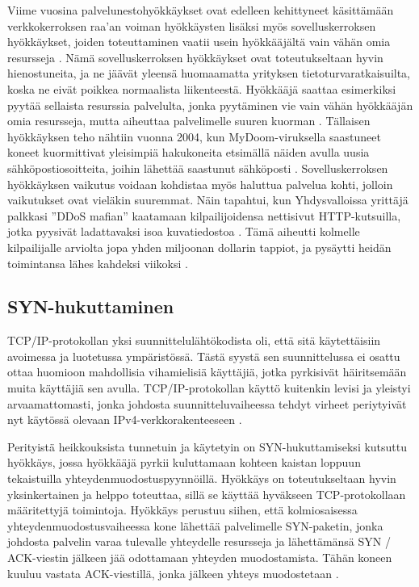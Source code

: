Viime vuosina palvelunestohyökkäykset ovat edelleen kehittyneet
käsittämään verkkokerroksen raa’an voiman hyökkäysten lisäksi myös
sovelluskerroksen hyökkäykset, joiden toteuttaminen vaatii usein
hyökkääjältä vain vähän omia resursseja \cite{Hacking}. Nämä sovelluskerroksen
hyökkäykset ovat toteutukseltaan hyvin hienostuneita, ja ne
jäävät yleensä huomaamatta yrityksen tietoturvaratkaisuilta, koska ne
eivät poikkea normaalista liikenteestä. Hyökkääjä saattaa esimerkiksi
pyytää sellaista resurssia palvelulta, jonka pyytäminen vie vain vähän
hyökkääjän omia resursseja, mutta aiheuttaa palvelimelle suuren
kuorman \cite{DDOSb}. Tällaisen hyökkäyksen teho nähtiin vuonna 2004, kun
MyDoom-viruksella saastuneet koneet kuormittivat yleisimpiä
hakukoneita etsimällä näiden avulla uusia sähköpostiosoitteita, joihin
lähettää saastunut sähköposti \cite{Hacking}. Sovelluskerroksen hyökkäyksen
vaikutus voidaan kohdistaa myös haluttua palvelua kohti, jolloin
vaikutukset ovat vieläkin suuremmat. Näin tapahtui, kun Yhdysvalloissa
yrittäjä palkkasi ”DDoS mafian” kaatamaan kilpailijoidensa nettisivut
HTTP-kutsuilla, jotka pyysivät ladattavaksi isoa kuvatiedostoa
\cite{DDOSb}. Tämä aiheutti kolmelle kilpailijalle arviolta jopa yhden
miljoonan dollarin tappiot, ja pysäytti heidän toimintansa lähes kahdeksi
viikoksi \cite{FBI}.

\subsection{SYN-hukuttaminen}
TCP/IP-protokollan yksi suunnittelulähtökodista oli, että sitä
käytettäisiin avoimessa ja luotetussa ympäristössä. Tästä syystä sen
suunnittelussa ei osattu ottaa huomioon mahdollisia vihamielisiä
käyttäjiä, jotka pyrkisivät häiritsemään muita käyttäjiä sen
avulla. TCP/IP-protokollan käyttö kuitenkin levisi ja yleistyi
arvaamattomasti, jonka johdosta suunnitteluvaiheessa tehdyt virheet
periytyivät nyt käytössä olevaan IPv4-verkkorakenteeseen \cite{Hacking}.

Perityistä heikkouksista tunnetuin ja käytetyin on SYN-hukuttamiseksi kutsuttu
hyökkäys, jossa hyökkääjä pyrkii kuluttamaan kohteen kaistan loppuun
tekaistuilla yhteydenmuodostuspyynnöillä. Hyökkäys on toteutukseltaan hyvin
yksinkertainen ja helppo toteuttaa, sillä se käyttää hyväkseen TCP-protokollaan
määritettyjä toimintoja. Hyökkäys perustuu siihen, että kolmiosaisessa
yhteydenmuodostusvaiheessa kone lähettää palvelimelle SYN-paketin, jonka
johdosta palvelin varaa tulevalle yhteydelle resursseja ja lähettämänsä SYN /
ACK-viestin jälkeen jää odottamaan yhteyden muodostamista. Tähän koneen kuuluu
vastata ACK-viestillä, jonka jälkeen yhteys muodostetaan \cite{Hacking}.

